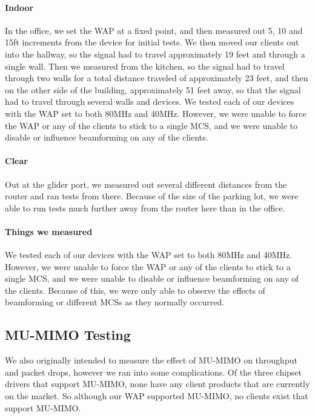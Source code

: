 \paragraph{Indoor}
In the office, we set the WAP at a fixed point, and then measured out 5, 10 and
15ft increments from the device for initial tests. We then moved our clients out
into the hallway, so the signal had to travel approximately 19 feet and through
a single wall. Then we measured from the kitchen, so the signal had to travel
through two walls for a total distance traveled of approximately 23 feet, and
then on the other side of the building, approximately 51 feet away, so that the
signal had to travel through several walls and devices. We tested each of our
devices with the WAP set to both 80MHz and 40MHz.  However, we were unable to
force the WAP or any of the clients to stick to a single MCS, and we were unable
to disable or influence beamforming on any of the clients.

\paragraph{Clear}
Out at the glider port, we measured out several different distances from the
router and ran tests from there. Because of the size of the parking lot, we were
able to run tests much further away from the router here than in the office.

\paragraph{  Things we measured }
We tested each of our devices with the WAP set to both 80MHz and 40MHz.
However, we were unable to force the WAP or any of the clients to stick to a
single MCS, and we were unable to disable or influence beamforming on any of the
clients. Because of this, we were only able to observe the effects of
beamforming or different MCSs as they normally occurred.


\subsection{MU-MIMO Testing}

We also originally intended to measure the effect of MU-MIMO on
throughput and packet drops, however we ran into some
complications. Of the three chipset drivers that support MU-MIMO, none
have any client products that are currently on the market. So although
our WAP supported MU-MIMO, no clients exist that support MU-MIMO.

